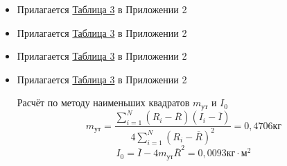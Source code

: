 \begin{itemize}
    \item Прилагается \hyperlink{table3}{Таблица 3} в Приложении 2
    \item Прилагается \hyperlink{table4}{Таблица 3} в Приложении 2
    \item Прилагается \hyperlink{table5}{Таблица 3} в Приложении 2
    \item Прилагается \hyperlink{table6}{Таблица 3} в Приложении 2

    Расчёт по методу наименьших квадратов $m_\text{ут}$ и $I_0$ \\
    \[
        m_\text{ут} = \frac{\sum_{i=1}^{N} \left( R_i - \overline{R} \right) \left( I_i - \overline{I} \right)}{4\sum_{i=1}^{N} \left( R_i - \overline{R} \right)^2} = 0,4706 \text{кг}
    \]
    \[
        I_0 = \overline{I} - 4m_{\text{ут}}\overline{R}^2 = 0,0093 \text{кг} \cdot \text{м}^2
    \]
\end{itemize}